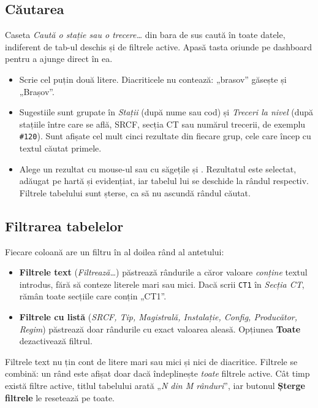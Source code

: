 \documentclass[11pt,a4paper]{article}
\newcommand{\code}[1]{\texttt{#1}}
\newcommand{\ui}[1]{\textsf{\textbf{#1}}}
\newcommand{\kbd}[1]{\fbox{\footnotesize\texttt{#1}}}
\begin{document}
\subsection{Căutarea}

Caseta \emph{Caută o stație sau o trecere\dots} din bara de sus caută în
toate datele, indiferent de tab-ul deschis și de filtrele active. Apasă
tasta \kbd{/} oriunde pe dashboard pentru a ajunge direct în ea.

\begin{itemize}
  \item Scrie cel puțin două litere. Diacriticele nu contează: „brasov”
        găsește și „Brașov”.
  \item Sugestiile sunt grupate în \emph{Stații} (după nume sau cod) și
        \emph{Treceri la nivel} (după stațiile între care se află, SRCF,
        secția CT sau numărul trecerii, de exemplu \code{\#120}). Sunt afișate
        cel mult cinci rezultate din fiecare grup, cele care încep cu textul
        căutat primele.
  \item Alege un rezultat cu mouse-ul sau cu săgețile și \kbd{Enter}.
        Rezultatul este selectat, adăugat pe hartă și evidențiat, iar tabelul
        lui se deschide la rândul respectiv. Filtrele tabelului sunt șterse,
        ca să nu ascundă rândul căutat.
\end{itemize}

\subsection{Filtrarea tabelelor}

Fiecare coloană are un filtru în al doilea rând al antetului:

\begin{itemize}
  \item \textbf{Filtrele text} (\emph{Filtrează\dots}) păstrează rândurile a
        căror valoare \emph{conține} textul introdus, fără să conteze literele
        mari sau mici. Dacă scrii \code{CT1} în \emph{Secția CT}, rămân toate
        secțiile care conțin „CT1”.
  \item \textbf{Filtrele cu listă} (\emph{SRCF, Tip, Magistrală, Instalație,
        Config, Producător, Regim}) păstrează doar rândurile cu exact valoarea
        aleasă. Opțiunea \ui{Toate} dezactivează filtrul.
\end{itemize}

Filtrele text nu țin cont de litere mari sau mici și nici de diacritice.
Filtrele se combină: un rând este afișat doar dacă îndeplinește \emph{toate}
filtrele active. Cât timp există filtre active, titlul tabelului arată
„\emph{N din M rânduri}”, iar butonul \ui{Șterge filtrele}
le resetează pe toate.
\end{document}
